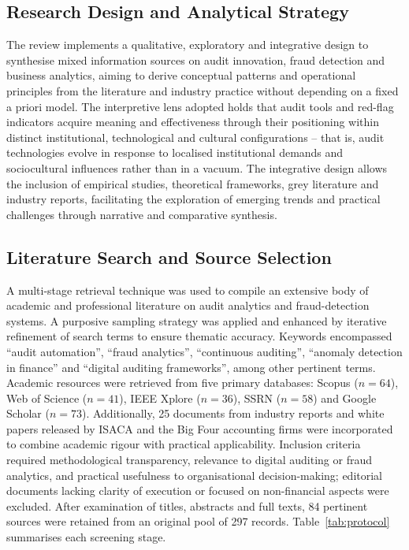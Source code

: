 \documentclass[preprint,12pt]{elsarticle}
\begin{document}
\subsection{Research Design and Analytical Strategy}

The review implements a qualitative, exploratory and integrative design to synthesise mixed information sources on audit innovation, fraud detection and business analytics, aiming to derive conceptual patterns and operational principles from the literature and industry practice without depending on a fixed a priori model. The interpretive lens adopted holds that audit tools and red-flag indicators acquire meaning and effectiveness through their positioning within distinct institutional, technological and cultural configurations -- that is, audit technologies evolve in response to localised institutional demands and sociocultural influences rather than in a vacuum. The integrative design allows the inclusion of empirical studies, theoretical frameworks, grey literature and industry reports, facilitating the exploration of emerging trends and practical challenges through narrative and comparative synthesis.

\subsection{Literature Search and Source Selection}

A multi-stage retrieval technique was used to compile an extensive body of academic and professional literature on audit analytics and fraud-detection systems. A purposive sampling strategy was applied and enhanced by iterative refinement of search terms to ensure thematic accuracy. Keywords encompassed ``audit automation'', ``fraud analytics'', ``continuous auditing'', ``anomaly detection in finance'' and ``digital auditing frameworks'', among other pertinent terms. Academic resources were retrieved from five primary databases: Scopus ($n=64$), Web of Science ($n=41$), IEEE Xplore ($n=36$), SSRN ($n=58$) and Google Scholar ($n=73$). Additionally, 25 documents from industry reports and white papers released by ISACA and the Big Four accounting firms were incorporated to combine academic rigour with practical applicability. Inclusion criteria required methodological transparency, relevance to digital auditing or fraud analytics, and practical usefulness to organisational decision-making; editorial documents lacking clarity of execution or focused on non-financial aspects were excluded. After examination of titles, abstracts and full texts, 84 pertinent sources were retained from an original pool of 297 records. Table~\ref{tab:protocol} summarises each screening stage.
\end{document}

